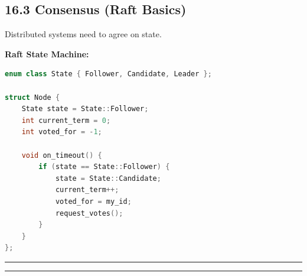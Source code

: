 \hypertarget{consensus-raft-basics}{%
\subsection{16.3 Consensus (Raft Basics)}\label{consensus-raft-basics}}

Distributed systems need to agree on state.

\textbf{Raft State Machine:}

\begin{lstlisting}[language={C++}]
enum class State { Follower, Candidate, Leader };

struct Node {
    State state = State::Follower;
    int current_term = 0;
    int voted_for = -1;
    
    void on_timeout() {
        if (state == State::Follower) {
            state = State::Candidate;
            current_term++;
            voted_for = my_id;
            request_votes();
        }
    }
};
\end{lstlisting}

\begin{center}\rule{0.5\linewidth}{0.5pt}\end{center}

\begin{center}\rule{0.5\linewidth}{0.5pt}\end{center}
